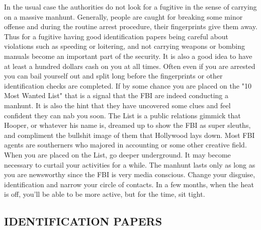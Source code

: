 \documentclass[11pt,twoside,a4paper]{book}
\begin{document}
In the usual case the authorities do not look for a fugitive in the sense of carrying on a massive manhunt. Generally, people are caught for breaking some minor offense and during the routine arrest procedure, their fingerprints give them away. Thus for a fugitive having good identification papers being careful about violations such as speeding or loitering, and not carrying weapons or bombing manuals become an important part of the security. It is also a good idea to have at least a hundred dollars cash on you at all times. Often even if you are arrested you can bail yourself out and split long before the fingerprints or other identification checks are completed. If by some chance you are placed on the "10 Most Wanted List" that is a signal that the FBI are indeed conducting a manhunt. It is also the hint that they have uncovered some clues and feel confident they can nab you soon. The List is a public relations gimmick that Hooper, or whatever his name is, dreamed up to show the FBI as super sleuths, and compliment the bullshit image of them that Hollywood lays down. Most FBI agents are southerners who majored in accounting or some other creative field. When you are placed on the List, go deeper underground. It may become necessary to curtail your activities for a while. The manhunt lasts only as long as you are newsworthy since the FBI is very media conscious. Change your disguise, identification and narrow your circle of contacts. In a few months, when the heat is off, you'll be able to be more active, but for the time, sit tight.

\subsection{IDENTIFICATION PAPERS}
\end{document}
